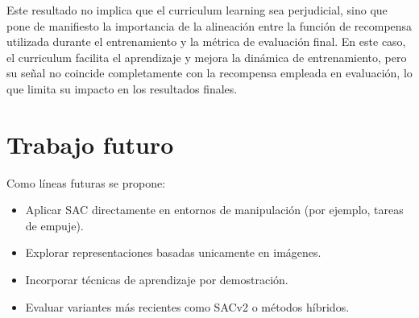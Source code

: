 \documentclass[10pt,twocolumn]{article}
\begin{document}
Este resultado no implica que el curriculum learning sea perjudicial, sino que pone de manifiesto la importancia de la alineación entre la función de recompensa utilizada durante el entrenamiento y la métrica de evaluación final. En este caso, el curriculum facilita el aprendizaje y mejora la dinámica de entrenamiento, pero su señal no coincide completamente con la recompensa empleada en evaluación, lo que limita su impacto en los resultados finales.

\section*{Trabajo futuro}

Como líneas futuras se propone:
\begin{itemize}
    \item Aplicar SAC directamente en entornos de manipulación (por ejemplo, tareas de empuje).
    \item Explorar representaciones basadas unicamente en imágenes.
    \item Incorporar técnicas de aprendizaje por demostración.
    \item Evaluar variantes más recientes como SACv2 o métodos híbridos.
\end{itemize}
\end{document}
